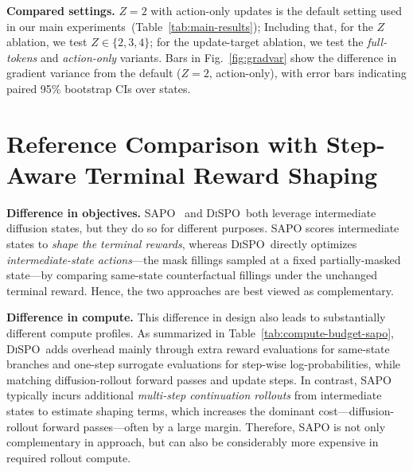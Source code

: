 \documentclass{article}
\newcommand{\method}{{\textsc{DiSPO}}}
\theoremstyle{plain}
\theoremstyle{definition}
\theoremstyle{remark}
\begin{document}
\textbf{Compared settings.}
$Z=2$ with action-only updates is the default setting used in our main experiments~(Table~\ref{tab:main-results}); 
Including that, for the $Z$ ablation, we test $Z\in\{2,3,4\}$; for the update-target ablation, we test the \emph{full-tokens} and \emph{action-only} variants.
Bars in Fig.~\ref{fig:gradvar} show the difference in gradient variance from the default ($Z=2$, action-only), with error bars indicating paired 95\% bootstrap CIs over states.






\section{Reference Comparison with Step-Aware Terminal Reward Shaping}\label{app:sapo}

\textbf{Difference in objectives.}
SAPO~\citep{sapo} and \method\ both leverage intermediate diffusion states, but they do so for different purposes.
SAPO scores intermediate states to \emph{shape the terminal rewards}, whereas \method\ directly optimizes \emph{intermediate-state actions}---the mask fillings sampled at a fixed partially-masked state---by comparing same-state counterfactual fillings under the unchanged terminal reward.
Hence, the two approaches are best viewed as complementary.

\textbf{Difference in compute.}
This difference in design also leads to substantially different compute profiles.
As summarized in Table~\ref{tab:compute-budget-sapo}, \method\ adds overhead mainly through extra reward evaluations for same-state branches and one-step surrogate evaluations for step-wise log-probabilities, while matching diffusion-rollout forward passes and update steps.
In contrast, SAPO typically incurs additional \emph{multi-step continuation rollouts} from intermediate states to estimate shaping terms, which increases the dominant cost---diffusion-rollout forward passes---often by a large margin.
Therefore, SAPO is not only complementary in approach, but can also be considerably more expensive in required rollout compute.
\end{document}
